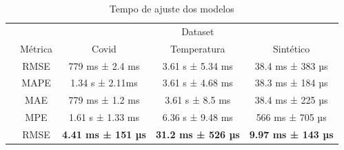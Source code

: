 \begin{table}[!htp]
    \caption{Tempo de ajuste dos modelos}
    \setlength\extrarowheight{5pt}
    \begin{tabular}{|c|c|ccc|}
        \hline
        \rowcolor[HTML]{C0C0C0}
        \cellcolor[HTML]{C0C0C0}                          & \cellcolor[HTML]{C0C0C0}                          & \multicolumn{3}{c|}{\cellcolor[HTML]{C0C0C0}Dataset}                                                                                                                         \\ \cline{3-5}
        \rowcolor[HTML]{C0C0C0}
        \multirow{-2}{*}{\cellcolor[HTML]{C0C0C0}Modelo}  & \multirow{-2}{*}{\cellcolor[HTML]{C0C0C0}Métrica} & \multicolumn{1}{c|}{\cellcolor[HTML]{C0C0C0}Covid}                      & \multicolumn{1}{c|}{\cellcolor[HTML]{C0C0C0}Temperatura}               & Sintético                 \\ \hline
        \cellcolor[HTML]{C0C0C0}                          & RMSE                                              & \multicolumn{1}{c|}{779 ms ± 2.4 ms}                                    & \multicolumn{1}{c|}{3.61 s ± 5.34 ms}                                  & 38.4 ms ± 383 µs          \\ \cline{2-5}
        \rowcolor[HTML]{EFEFEF}
        \cellcolor[HTML]{C0C0C0}                          & MAPE                                              & \multicolumn{1}{c|}{\cellcolor[HTML]{EFEFEF}1.34 s ± 2.11ms}            & \multicolumn{1}{c|}{\cellcolor[HTML]{EFEFEF}3.61 s ± 4.68 ms}          & 38.3 ms ± 184 µs          \\ \cline{2-5}
        \cellcolor[HTML]{C0C0C0}                          & MAE                                               & \multicolumn{1}{c|}{779 ms ± 1.2 ms}                                    & \multicolumn{1}{c|}{3.61 s ± 8.5 ms}                                   & 38.4 ms ± 225 µs          \\ \cline{2-5}
        \rowcolor[HTML]{EFEFEF}
        \multirow{-4}{*}{\cellcolor[HTML]{C0C0C0}ARIMA}   & MPE                                               & \multicolumn{1}{c|}{\cellcolor[HTML]{EFEFEF}1.61 s ± 1.33 ms}           & \multicolumn{1}{c|}{\cellcolor[HTML]{EFEFEF}6.36 s ± 9.48 ms}          & 566 ms ± 705 µs           \\ \hline
        \cellcolor[HTML]{C0C0C0}                          & RMSE                                              & \multicolumn{1}{c|}{\textbf{4.41 ms ± 151 µs}}                          & \multicolumn{1}{c|}{\textbf{31.2 ms ± 526 µs}}                         & \textbf{9.97 ms ± 143 µs} \\ \cline{2-5}

\end{tabular}
\end{table}
